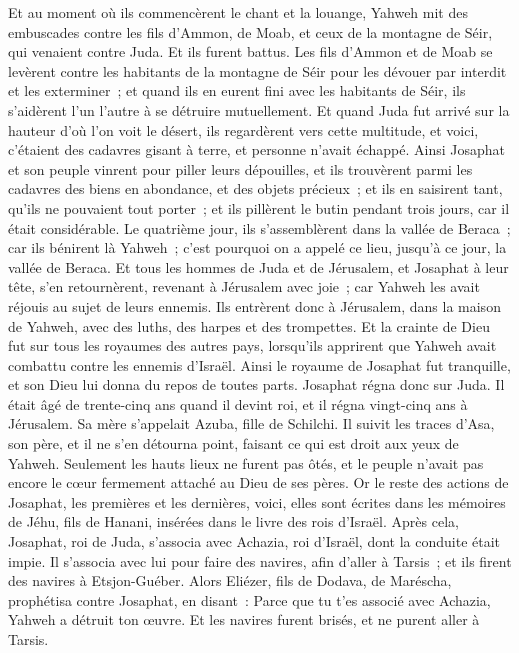\begin{multicols}{2}
Et au moment où ils commencèrent le chant et la louange, Yahweh mit des embuscades contre les fils d'Ammon, de Moab, et ceux de la montagne de Séir, qui venaient contre Juda. Et ils furent battus.
Les fils d'Ammon et de Moab se levèrent contre les habitants de la montagne de Séir pour les dévouer par interdit et les exterminer~; et quand ils en eurent fini avec les habitants de Séir, ils s'aidèrent l'un l'autre à se détruire mutuellement.
Et quand Juda fut arrivé sur la hauteur d'où l'on voit le désert, ils regardèrent vers cette multitude, et voici, c'étaient des cadavres gisant à terre, et personne n'avait échappé.
Ainsi Josaphat et son peuple vinrent pour piller leurs dépouilles, et ils trouvèrent parmi les cadavres des biens en abondance, et des objets précieux~; et ils en saisirent tant, qu'ils ne pouvaient tout porter~; et ils pillèrent le butin pendant trois jours, car il était considérable.
Le quatrième jour, ils s'assemblèrent dans la vallée de Beraca~; car ils bénirent là Yahweh~; c'est pourquoi on a appelé ce lieu, jusqu'à ce jour, la vallée de Beraca.
Et tous les hommes de Juda et de Jérusalem, et Josaphat à leur tête, s'en retournèrent, revenant à Jérusalem avec joie~; car Yahweh les avait réjouis au sujet de leurs ennemis. 
Ils entrèrent donc à Jérusalem, dans la maison de Yahweh, avec des luths, des harpes et des trompettes.
Et la crainte de Dieu fut sur tous les royaumes des autres pays, lorsqu'ils apprirent que Yahweh avait combattu contre les ennemis d'Israël.
Ainsi le royaume de Josaphat fut tranquille, et son Dieu lui donna du repos de toutes parts.
Josaphat régna donc sur Juda. Il était âgé de trente-cinq ans quand il devint roi, et il régna vingt-cinq ans à Jérusalem. Sa mère s'appelait Azuba, fille de Schilchi.
Il suivit les traces d'Asa, son père, et il ne s'en détourna point, faisant ce qui est droit aux yeux de Yahweh.
Seulement les hauts lieux ne furent pas ôtés, et le peuple n'avait pas encore le cœur fermement attaché au Dieu de ses pères.
Or le reste des actions de Josaphat, les premières et les dernières, voici, elles sont écrites dans les mémoires de Jéhu, fils de Hanani, insérées dans le livre des rois d'Israël.
Après cela, Josaphat, roi de Juda, s'associa avec Achazia, roi d'Israël, dont la conduite était impie.
Il s'associa avec lui pour faire des navires, afin d'aller à Tarsis~; et ils firent des navires à Etsjon-Guéber.
Alors Eliézer, fils de Dodava, de Maréscha, prophétisa contre Josaphat, en disant~: Parce que tu t'es associé avec Achazia, Yahweh a détruit ton œuvre. Et les navires furent brisés, et ne purent aller à Tarsis.

\end{multicols}
